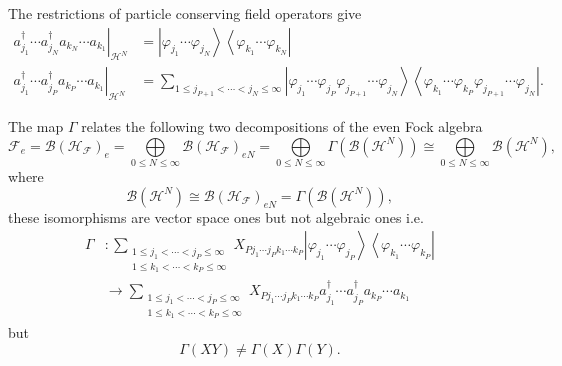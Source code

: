 \documentclass[aps,preprint]{revtex4}%
\begin{document}
The restrictions of particle conserving field operators give
\begin{align}
\left.  a_{j_{1}}^{\dagger}\cdots a_{j_{N}}^{\dagger}a_{k_{N}}\cdots a_{k_{1}%
}\right\vert _{\mathcal{H}^{N}}  &  =\left\vert \varphi_{j_{1}}\cdots
\varphi_{j_{N}}\right\rangle \left\langle \varphi_{k_{1}}\cdots\varphi_{k_{N}%
}\right\vert \nonumber\\
\left.  a_{j_{1}}^{\dagger}\cdots a_{j_{P}}^{\dagger}a_{k_{P}}\cdots a_{k_{1}%
}\right\vert _{\mathcal{H}^{N}}  &  =\sum_{1\leq j_{P+1}<\cdots<j_{N}%
\leq\infty}\left\vert \varphi_{j_{1}}\cdots\varphi_{j_{P}}\varphi_{j_{P+1}%
}\cdots\varphi_{j_{N}}\right\rangle \left\langle \varphi_{k_{1}}\cdots
\varphi_{k_{P}}\varphi_{j_{P+1}}\cdots\varphi_{j_{N}}\right\vert .
\end{align}


The map $\Gamma$ relates the following two decompositions of the even Fock
algebra%
\begin{equation}
\mathcal{F}_{e}=\mathcal{B}\left(  \mathcal{H}_{\mathcal{F}}\right)  _{e}=%
{\displaystyle\bigoplus\limits_{0\leq N\leq\infty}}
\mathcal{B}\left(  \mathcal{H}_{\mathcal{F}}\right)  _{eN}=%
{\displaystyle\bigoplus\limits_{0\leq N\leq\infty}}
\Gamma\left(  \mathcal{B}\left(  \mathcal{H}^{N}\right)  \right)  \cong%
{\displaystyle\bigoplus\limits_{0\leq N\leq\infty}}
\mathcal{B}\left(  \mathcal{H}^{N}\right)  ,
\end{equation}
where
\begin{equation}
\mathcal{B}\left(  \mathcal{H}^{N}\right)  \cong\mathcal{B}\left(
\mathcal{H}_{\mathcal{F}}\right)  _{eN}=\Gamma\left(  \mathcal{B}\left(
\mathcal{H}^{N}\right)  \right)  ,
\end{equation}
these isomorphisms are vector space ones but not algebraic ones i.e.%
\begin{align}
\Gamma &  :\sum_{\substack{1\leq j_{1}<\cdots<j_{P}\leq\infty\\1\leq
k_{1}<\cdots<k_{P}\leq\infty}}X_{Pj_{1}\cdots j_{P}k_{1}\cdots k_{P}%
}\left\vert \varphi_{j_{1}}\cdots\varphi_{j_{P}}\right\rangle \left\langle
\varphi_{k_{1}}\cdots\varphi_{k_{P}}\right\vert \nonumber\\
&  \longrightarrow\sum_{\substack{1\leq j_{1}<\cdots<j_{P}\leq\infty\\1\leq
k_{1}<\cdots<k_{P}\leq\infty}}X_{Pj_{1}\cdots j_{P}k_{1}\cdots k_{P}}a_{j_{1}%
}^{\dagger}\cdots a_{j_{P}}^{\dagger}a_{k_{P}}\cdots a_{k_{1}}%
\end{align}
but
\begin{equation}
\Gamma(XY)\neq\Gamma(X)\Gamma(Y).
\end{equation}
\end{document}
